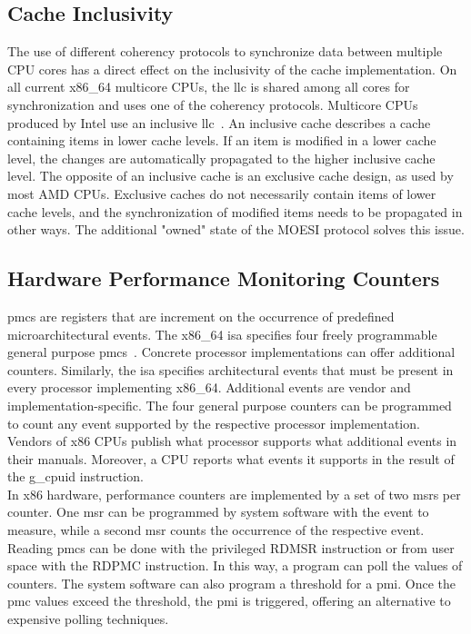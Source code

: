 \subsection{Cache Inclusivity}
\label{sec:state:technical:caches_inclusivity}
The use of different coherency protocols to synchronize data between multiple
CPU cores has a direct effect on the inclusivity of the cache implementation. On
all current x86\_64 multicore CPUs, the \gls{llc} is shared among all cores for
synchronization and uses one of the coherency protocols. Multicore CPUs produced
by Intel use an inclusive \gls{llc}~\cite{intel_optimization}. An inclusive
cache describes a cache containing items in lower cache levels. If an item is
modified in a lower cache level, the changes are automatically propagated to the
higher inclusive cache level. The opposite of an inclusive cache is an exclusive
cache design, as used by most AMD CPUs. Exclusive caches do not necessarily
contain items of lower cache levels, and the synchronization of modified items
needs to be propagated in other ways. The additional "owned" state of the MOESI
protocol solves this issue.

\subsection{Hardware Performance Monitoring Counters}
\label{sec:state:technical:hpc}
\glspl{pmc} are registers that are increment on the occurrence of predefined
microarchitectural events. The x86\_64 \gls{isa} specifies four freely
programmable general purpose \glspl{pmc}~\cite{amd_manual}. Concrete processor
implementations can offer additional counters. Similarly, the \gls{isa}
specifies architectural events that must be present in every processor
implementing x86\_64. Additional events are vendor and implementation-specific.
The four general purpose counters can be programmed to count any event supported
by the respective processor implementation. Vendors of x86 CPUs publish what
processor supports what additional events in their manuals. Moreover, a CPU
reports what events it supports in the result of the \gls{g_cpuid} instruction.
\\

In x86 hardware, performance counters are implemented by a set of two
\glspl{msr} per counter. One \gls{msr} can be programmed by system software with
the event to measure, while a second \gls{msr} counts the occurrence of the
respective event. Reading \glspl{pmc} can be done with the privileged RDMSR
instruction or from user space with the RDPMC instruction. In this way, a
program can poll the values of counters. The system software can also program a
threshold for a \gls{pmi}. Once the \gls{pmc} values exceed the threshold, the
\gls{pmi} is triggered, offering an alternative to expensive polling
techniques.\\

